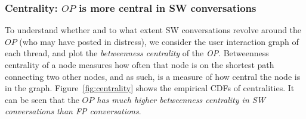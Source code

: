 \subsubsection{Centrality: $OP$ is more central in SW conversations}
To understand whether and to what extent SW conversations revolve around the $OP$ (who may have posted in distress), we consider the user interaction graph of each thread, and plot the \textit{betweenness centrality} of the \textit{OP}. Betweenness centrality of a node measures how often that node is on the shortest path connecting two other nodes, and as such, is a measure of how central the node is in the graph. Figure~\ref{fig:centrality} shows the empirical CDFs of centralities. It can be seen that the \textit{$OP$ has much higher betweenness centrality in SW conversations than FP conversations}. %




